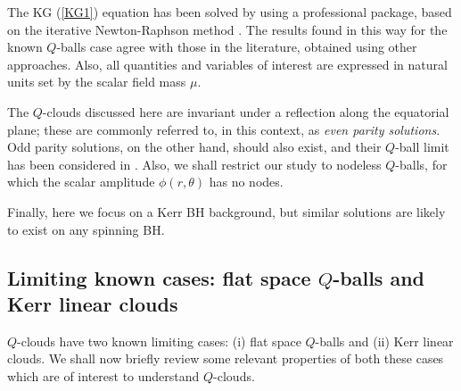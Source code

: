 %

The KG (\ref{KG1}) equation has been solved by using a professional package, 
based on the iterative Newton-Raphson method \cite{schoen}.
The results found in this way for the known $Q$-balls case 
agree with those in the literature, 
obtained using other approaches.
Also, all quantities and variables of interest are expressed in natural units 
set by the scalar field mass $\mu$.
 

The $Q$-clouds discussed here are invariant under a reflection along  
the equatorial plane; these are commonly referred to, in this context, as \textit{even parity solutions}. Odd parity
solutions, on the other hand, should also exist, and their $Q$-ball limit has been considered in 
\cite{Volkov:2002aj,Kleihaus:2007vk}.
Also, we shall restrict our study to nodeless $Q$-balls, for which the scalar amplitude $\phi(r,\theta)$ has no nodes.


Finally, here we focus on a Kerr BH background, but similar solutions are likely to exist on any spinning BH.

\subsection{Limiting known cases: flat space $Q$-balls and Kerr linear clouds}



$Q$-clouds have two known limiting cases: (i) flat space $Q$-balls and (ii) Kerr linear clouds. We shall now briefly review some relevant properties of both these cases which are of interest to understand $Q$-clouds. 

\bigskip


